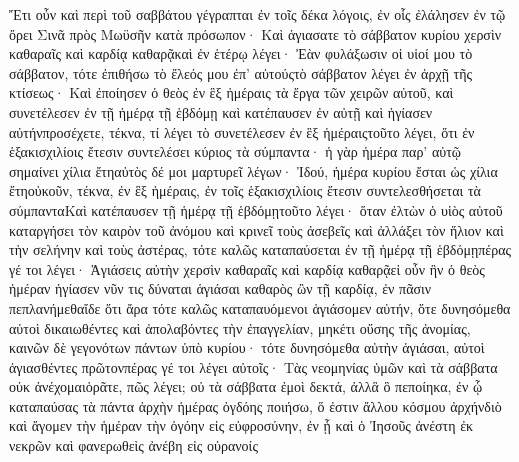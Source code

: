 Ἔτι οὖν καὶ περὶ τοῦ σαββάτου γέγραπται ἐν τοῖς δέκα λόγοις, ἐν οἷς ἐλάλησεν ἐν τῷ ὄρει Σινᾶ πρὸς Μωϋσῆν κατὰ πρόσωπον· Καὶ ἁγιασατε τὸ σάββατον κυρίου χερσὶν καθαραῖς καὶ καρδίᾳ καθαρᾷκαὶ ἐν ἑτέρῳ λέγει· Ἐὰν φυλάξωσιν οἱ υἱοί μου τὸ σάββατον, τότε ἐπιθήσω τὸ ἔλεός μου ἐπ’ αὐτούςτὸ σάββατον λέγει ἐν ἀρχῇ τῆς κτίσεως· Καὶ ἐποίησεν ὁ θεὸς ἐν ἓξ ἡμέραις τὰ ἔργα τῶν χειρῶν αὐτοῦ, καὶ συνετέλεσεν ἐν τῇ ἡμέρᾳ τῇ ἑβδόμῃ καὶ κατέπαυσεν ἐν αὐτῇ καὶ ἡγίασεν αὐτήνπροσέχετε, τέκνα, τί λέγει τὸ συνετέλεσεν ἐν ἓξ ἡμέραιςτοῦτο λέγει, ὅτι ἐν ἑξακισχιλίοις ἔτεσιν συντελέσει κύριος τὰ σύμπαντα· ἡ γὰρ ἡμέρα παρ’ αὐτῷ σημαίνει χίλια ἔτηαὐτὸς δέ μοι μαρτυρεῖ λέγων· Ἰδού, ἡμέρα κυρίου ἔσται ὡς χίλια ἔτηοὐκοῦν, τέκνα, ἐν ἓξ ἡμέραις, ἐν τοῖς ἑξακισχιλίοις ἔτεσιν συντελεσθήσεται τὰ σύμπανταΚαὶ κατέπαυσεν τῇ ἡμέρᾳ τῇ ἑβδόμῃτοῦτο λέγει· ὅταν ἐλτὼν ὁ υἱὸς αὐτοῦ καταργήσει τὸν καιρὸν τοῦ ἀνόμου καὶ κρινεῖ τοὺς ἀσεβεῖς καὶ ἀλλάξει τὸν ἥλιον καὶ τὴν σελήνην καὶ τοὺς ἀστέρας, τότε καλῶς καταπαύσεται ἐν τῇ ἡμέρᾳ τῇ ἑβδόμῃπέρας γέ τοι λέγει· Ἁγιάσεις αὐτὴν χερσὶν καθαραῖς καὶ καρδίᾳ καθαρᾷεἰ οὖν ἣν ὁ θεὸς ἡμέραν ἡγίασεν νῦν τις δύναται ἁγιάσαι καθαρὸς ὢν τῇ καρδίᾳ, ἐν πᾶσιν πεπλανήμεθαἴδε ὅτι ἄρα τότε καλῶς καταπαυόμενοι ἁγιάσομεν αὐτήν, ὅτε δυνησόμεθα αὐτοὶ δικαιωθέντες καὶ ἀπολαβόντες τὴν ἐπαγγελίαν, μηκέτι οὔσης τῆς ἀνομίας, καινῶν δὲ γεγονότων πάντων ὑπὸ κυρίου· τότε δυνησόμεθα αὐτὴν ἁγιάσαι, αὐτοὶ ἁγιασθέντες πρῶτονπέρας γέ τοι λέγει αὐτοῖς· Τὰς νεομηνίας ὑμῶν καὶ τὰ σάββατα οὐκ ἀνέχομαιὁρᾶτε, πῶς λέγει; οὐ τὰ σάββατα ἐμοὶ δεκτά, ἀλλἃ ὃ πεποίηκα, ἐν ᾧ καταπαύσας τὰ πάντα ἀρχὴν ἡμέρας ὀγδόης ποιήσω, ὅ ἐστιν ἄλλου κόσμου ἀρχήνδιὸ καὶ ἄγομεν τὴν ἡμέραν τὴν ὀγόην εἰς εὐφροσύνην, ἐν ᾗ καὶ ὁ Ἰησοῦς ἀνέστη ἐκ νεκρῶν καὶ φανερωθεὶς ἀνέβη εἰς οὐρανοίς
